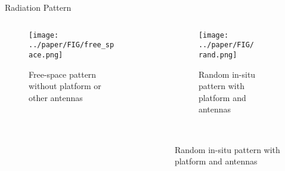 \documentclass{beamer}
\begin{document}
\begin{frame}{Radiation Pattern}
    \begin{columns}
        \begin{column}{0.5\linewidth}
            \begin{figure}
                \vspace*{-2cm}
                \caption*{Free-space pattern without platform or other antennas}
                \centering
                \texttt{[image: ../paper/FIG/free\_space.png]}
            \end{figure}
        \end{column}
        \begin{column}{0.5\linewidth}
\begin{overlayarea}{\textwidth}{\textheight}
            \begin{figure}
                \vspace*{-0.7cm}
                \begin{subfigure}{\columnwidth}
                    \centering
                        \caption*{\tiny {Random in-situ pattern with platform and antennas}}%
                        \texttt{[image: ../paper/FIG/rand.png]}
                \end{subfigure}\\\vfill
            \end{figure}
        \end{overlayarea}
        \end{column}
    \end{columns}
\end{frame}
\end{document}
